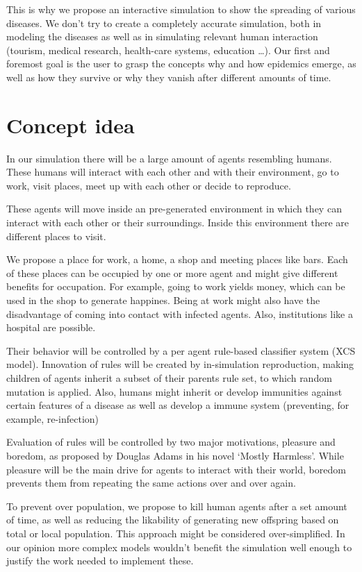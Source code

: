 \documentclass{acmtog} %
\begin{document}
This is why we propose an interactive simulation to show the spreading of various diseases. We don't try to create a completely accurate simulation, both in modeling the diseases as well as in simulating relevant human interaction (tourism, medical research, health-care systems, education \dots). Our first and foremost goal is the user to grasp the concepts why and how epidemics emerge, as well as how they survive or why they vanish after different amounts of time.

\section{Concept idea}

In our simulation there will be a large amount of agents resembling humans. These humans will interact with each other and with their environment, go to work, visit places, meet up with each other or decide to reproduce.

These agents will move inside an pre-generated environment in which they can interact with each other or their surroundings. Inside this environment there are different places to visit.

We propose a place for work, a home, a shop and meeting places like bars. Each of these places can be occupied by one or more agent and might give different benefits for occupation. For example, going to work yields money, which can be used in the shop to generate happines. Being at work might also have the disadvantage of coming into contact with infected agents. Also, institutions like a hospital are possible.

Their behavior will be controlled by a per agent rule-based classifier system (XCS model). Innovation of rules will be created by in-simulation reproduction, making children of agents inherit a subset of their parents rule set, to which random mutation is applied. Also, humans might inherit or develop immunities against certain features of a disease as well as develop a immune system (preventing, for example, re-infection)

Evaluation of rules will be controlled by two major motivations, pleasure and boredom, as proposed by Douglas Adams in his novel `Mostly Harmless'. While pleasure will be the main drive for agents to interact with their world, boredom prevents them from repeating the same actions over and over again.

To prevent over population, we propose to kill human agents after a set amount of time, as well as reducing the likability of generating new offspring based on total or local population. This approach might be considered over-simplified. In our opinion more complex models wouldn't benefit the simulation well enough to justify the work needed to implement these.
\end{document}
